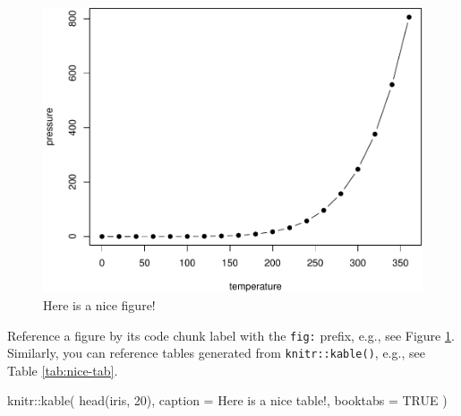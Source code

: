 \documentclass[
  fontsize=13pt,
  english,
  a4paper,
  openany, a4paper, oneside]{article}
\newenvironment{Shaded}{\begin{snugshade}}{\end{snugshade}}
\newcommand{\AttributeTok}[1]{\textcolor[rgb]{0.77,0.63,0.00}{#1}}
\newcommand{\ConstantTok}[1]{\textcolor[rgb]{0.00,0.00,0.00}{#1}}
\newcommand{\DecValTok}[1]{\textcolor[rgb]{0.00,0.00,0.81}{#1}}
\newcommand{\FunctionTok}[1]{\textcolor[rgb]{0.00,0.00,0.00}{#1}}
\newcommand{\NormalTok}[1]{#1}
\newcommand{\SpecialCharTok}[1]{\textcolor[rgb]{0.00,0.00,0.00}{#1}}
\newcommand{\StringTok}[1]{\textcolor[rgb]{0.31,0.60,0.02}{#1}}
\begin{document}
\begin{figure}

{\centering \includegraphics[width=0.8\linewidth]{reprex_collaboration_guide_files/figure-latex/nice-fig-1} 

}

\caption{Here is a nice figure!}\label{fig:nice-fig}
\end{figure}

Reference a figure by its code chunk label with the \texttt{fig:} prefix, e.g., see Figure \ref{fig:nice-fig}. Similarly, you can reference tables generated from \texttt{knitr::kable()}, e.g., see Table \ref{tab:nice-tab}.

\begin{Shaded}
\begin{Highlighting}[]
\NormalTok{knitr}\SpecialCharTok{::}\FunctionTok{kable}\NormalTok{(}
  \FunctionTok{head}\NormalTok{(iris, }\DecValTok{20}\NormalTok{), }\AttributeTok{caption =} \StringTok{\textquotesingle{}Here is a nice table!\textquotesingle{}}\NormalTok{,}
  \AttributeTok{booktabs =} \ConstantTok{TRUE}
\NormalTok{)}
\end{Highlighting}
\end{Shaded}
\end{document}
